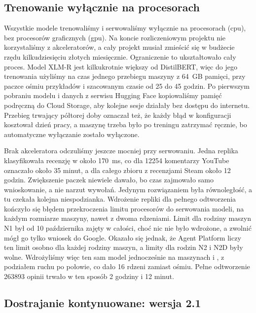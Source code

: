 \subsection{Trenowanie wyłącznie na procesorach}
\label{sec:impl-cpu}

Wszystkie modele trenowaliśmy i serwowaliśmy wyłącznie na procesorach (\ac{cpu}), bez procesorów graficznych (\ac{gpu}).
Na koncie rozliczeniowym projektu nie korzystaliśmy z akceleratorów, a cały projekt musiał zmieścić się w budżecie rzędu kilkudziesięciu złotych miesięcznie.
Ograniczenie to ukształtowało cały proces.
Model XLM-R jest kilkukrotnie większy od DistilBERT, więc do jego trenowania użyliśmy na czas jednego przebiegu maszyny  z 64~GB pamięci, przy paczce ośmiu przykładów i szacowanym czasie od 25 do 45 godzin.
Po pierwszym pobraniu modelu i danych z serwisu Hugging Face kopiowaliśmy pamięć podręczną do Cloud Storage, aby kolejne sesje działały bez dostępu do internetu.
Przebieg trwający półtorej doby oznaczał też, że każdy błąd w konfiguracji kosztował dzień pracy, a maszynę trzeba było po treningu zatrzymać ręcznie, bo automatyczne wyłączanie zostało wyłączone.

Brak akceleratora odczuliśmy jeszcze mocniej przy serwowaniu.
Jedna replika  klasyfikowała recenzję w około 170~ms, co dla \num{12254} komentarzy YouTube oznaczało około 35 minut, a dla całego zbioru z recenzjami Steam około 12 godzin.
Zwiększenie paczek niewiele dawało, bo czas zajmowało samo wnioskowanie, a nie narzut wywołań.
Jedynym rozwiązaniem była równoległość, a tu czekała kolejna niespodzianka.
Wdrożenie repliki dla pełnego odtworzenia kończyło się błędem przekroczenia limitu procesorów do serwowania modeli, na każdym rozmiarze maszyny, nawet z dwoma rdzeniami.
Limit dla rodziny maszyn N1 był od 10 października zajęty w całości, choć nic nie było wdrożone, a zwolnić mógł go tylko wniosek do Google.
Okazało się jednak, że Agent Platform liczy ten limit osobno dla każdej rodziny maszyn, a limity dla rodzin N2 i N2D były wolne.
Wdrożyliśmy więc ten sam model jednocześnie na maszynach  i , z podziałem ruchu po połowie, co dało 16 rdzeni zamiast ośmiu.
Pełne odtworzenie \num{263893} opinii trwało w ten sposób 2 godziny i 12 minut.

\subsection{Dostrajanie kontynuowane: wersja 2.1}
\label{sec:impl-xlmr-21}

